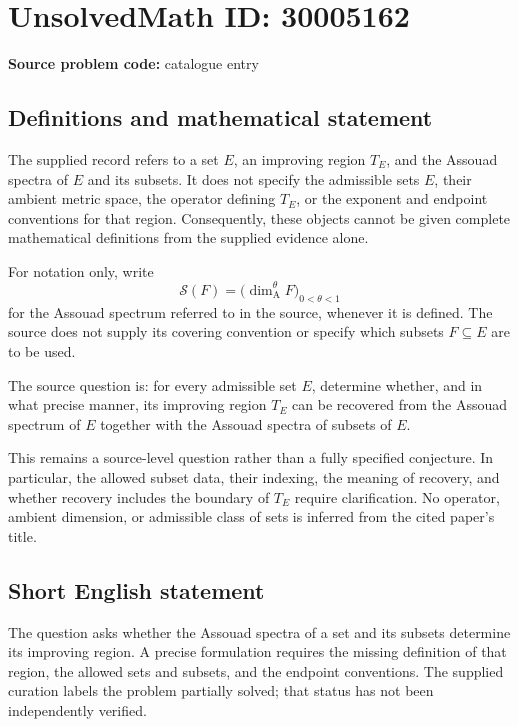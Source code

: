 \documentclass[11pt]{article}
\begin{document}
\section*{UnsolvedMath ID: 30005162}
\textbf{Source problem code:} catalogue entry
\subsection{Definitions and mathematical statement}
The supplied record refers to a set \(E\), an improving region \(T_E\), and the Assouad spectra of \(E\) and its subsets. It does not specify the admissible sets \(E\), their ambient metric space, the operator defining \(T_E\), or the exponent and endpoint conventions for that region. Consequently, these objects cannot be given complete mathematical definitions from the supplied evidence alone.

For notation only, write
\[
\mathcal S(F)=\bigl(\dim_{\mathrm A}^{\theta}F\bigr)_{0<\theta<1}
\]
for the Assouad spectrum referred to in the source, whenever it is defined. The source does not supply its covering convention or specify which subsets \(F\subseteq E\) are to be used.

The source question is: for every admissible set \(E\), determine whether, and in what precise manner, its improving region \(T_E\) can be recovered from the Assouad spectrum of \(E\) together with the Assouad spectra of subsets of \(E\).

This remains a source-level question rather than a fully specified conjecture. In particular, the allowed subset data, their indexing, the meaning of recovery, and whether recovery includes the boundary of \(T_E\) require clarification. No operator, ambient dimension, or admissible class of sets is inferred from the cited paper's title.
\subsection{Short English statement}
The question asks whether the Assouad spectra of a set and its subsets determine its improving region. A precise formulation requires the missing definition of that region, the allowed sets and subsets, and the endpoint conventions. The supplied curation labels the problem partially solved; that status has not been independently verified.
\end{document}
